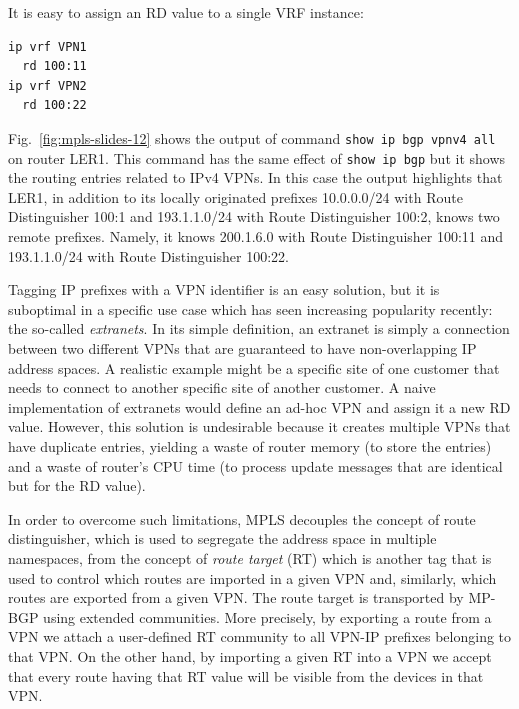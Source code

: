 \documentclass{article}
\newenvironment{codice}
{
\noindent
\begin{minipage}[b]{\columnwidth}
\definecolor{shadecolor}{rgb}{1,1,1}
\begin{framed}}
{
\vspace{-0.4cm}
\end{framed}
\end{minipage}
\definecolor{shadecolor}{rgb}{1,1,0.7}
}
\begin{document}
\begin{shaded}
\noindent
It is easy to assign an RD value to a single VRF instance:\\

\begin{codice}
\begin{verbatim}
ip vrf VPN1
  rd 100:11
ip vrf VPN2
  rd 100:22
\end{verbatim}
\end{codice}

Fig.~\ref{fig:mpls-slides-12} shows the output of command {\tt show ip bgp vpnv4 
all} on router LER1. This command has the same effect of {\tt show ip bgp} but 
it shows the routing entries related to IPv4 VPNs. In this case the output highlights 
that LER1, in addition to its locally originated prefixes 10.0.0.0/24 with Route Distinguisher 100:1 and 193.1.1.0/24 with Route Distinguisher 100:2, knows two remote prefixes. Namely, it knows 200.1.6.0 with 
Route Distinguisher 100:11 and 193.1.1.0/24 with Route Distinguisher 100:22.
\end{shaded}

Tagging IP prefixes with a VPN identifier is an easy solution, but it is 
suboptimal in a specific use case which has seen increasing popularity 
recently: the so-called \emph{extranets}. In its simple definition, an extranet 
is simply a connection between two different VPNs that are guaranteed to have 
non-overlapping IP address spaces. A realistic example might be a specific 
site of one customer that needs to connect to another specific site of 
another customer. A naive implementation of extranets would define an ad-hoc 
VPN and assign it a new RD value. However, this solution is undesirable because 
it creates multiple VPNs that have duplicate entries, yielding a waste of 
router memory (to store the entries) and a waste of router's CPU time (to 
process update messages that are identical but for the RD value).

In order to overcome such limitations, MPLS decouples the concept of route 
distinguisher, which is used to segregate the address space in multiple 
namespaces, from the concept of \emph{route target} (RT) which is another tag 
that is used to control which routes are imported in a given VPN and, 
similarly, which routes are exported from a given VPN. The route target is 
transported by MP-BGP using extended communities. More precisely, by 
exporting a route from a VPN we attach a user-defined RT community to all 
VPN-IP prefixes belonging to that VPN. On the other hand, by importing a 
given RT into a VPN we accept that every route having that RT value will 
be visible from the devices in that VPN.
\end{document}
